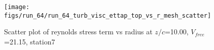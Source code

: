 \begin{figure}[H]
\centering
\texttt{[image: figs/run\_64/run\_64\_turb\_visc\_ettap\_top\_vs\_r\_mesh\_scatter]}
\caption{Scatter plot of reynolds stress term vs radius at $z/c$=10.00, $V_{free}$=21.15, station7}
\label{fig:run_64_turb_visc_ettap_top_vs_r_mesh_scatter}
\end{figure}


